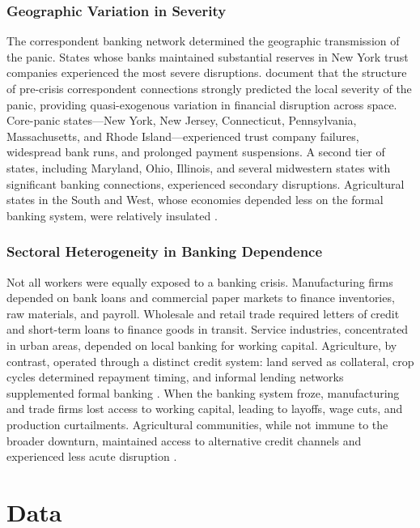 \documentclass[12pt]{article}
\begin{document}
\subsubsection*{Geographic Variation in Severity} The correspondent banking network determined the geographic transmission of the panic. States whose banks maintained substantial reserves in New York trust companies experienced the most severe disruptions. \citet{frydman2023panic} document that the structure of pre-crisis correspondent connections strongly predicted the local severity of the panic, providing quasi-exogenous variation in financial disruption across space. Core-panic states---New York, New Jersey, Connecticut, Pennsylvania, Massachusetts, and Rhode Island---experienced trust company failures, widespread bank runs, and prolonged payment suspensions. A second tier of states, including Maryland, Ohio, Illinois, and several midwestern states with significant banking connections, experienced secondary disruptions. Agricultural states in the South and West, whose economies depended less on the formal banking system, were relatively insulated \citep{wicker2000banking, carlson2005causes}.

\subsubsection*{Sectoral Heterogeneity in Banking Dependence} Not all workers were equally exposed to a banking crisis. Manufacturing firms depended on bank loans and commercial paper markets to finance inventories, raw materials, and payroll. Wholesale and retail trade required letters of credit and short-term loans to finance goods in transit. Service industries, concentrated in urban areas, depended on local banking for working capital. Agriculture, by contrast, operated through a distinct credit system: land served as collateral, crop cycles determined repayment timing, and informal lending networks supplemented formal banking \citep{james1978money}. When the banking system froze, manufacturing and trade firms lost access to working capital, leading to layoffs, wage cuts, and production curtailments. Agricultural communities, while not immune to the broader downturn, maintained access to alternative credit channels and experienced less acute disruption \citep{bordo2015economic}.


\section{Data}
\end{document}
